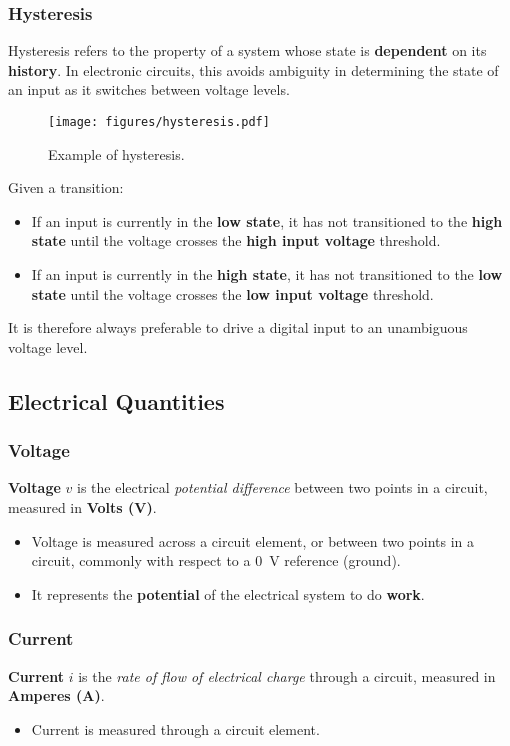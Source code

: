 \documentclass{article}
\begin{document}
\subsubsection{Hysteresis}
Hysteresis refers to the property of a system whose state is
\textbf{dependent} on its \textbf{history}. In electronic circuits,
this avoids ambiguity in determining the state of an input as it
switches between voltage levels.
\begin{figure}[H]
    \centering
    \texttt{[image: figures/hysteresis.pdf]}
    \caption{Example of hysteresis.} %
\end{figure}
Given a transition:
\begin{itemize}
    \item If an input is currently in the \textbf{low state}, it has
          not transitioned to the \textbf{high state} until the voltage
          crosses the \textbf{high input voltage} threshold.
    \item If an input is currently in the \textbf{high state}, it has
          not transitioned to the \textbf{low state} until the voltage
          crosses the \textbf{low input voltage} threshold.
\end{itemize}
It is therefore always preferable to drive a digital input to an unambiguous voltage level.
\subsection{Electrical Quantities}
\subsubsection{Voltage}
\textbf{Voltage} \(v\) is the electrical \textit{potential difference} between two points in a circuit, measured in \textbf{Volts (\unit{V})}.
\begin{itemize}
    \item Voltage is measured across a circuit element, or between two
          points in a circuit, commonly with respect to a \qty{0}{V}
          reference (ground).
    \item It represents the \textbf{potential} of the electrical system
          to do \textbf{work}.
\end{itemize}
\subsubsection{Current}
\textbf{Current} \(i\) is the \textit{rate of flow of electrical charge} through a circuit, measured in \textbf{Amperes (\unit{A})}.
\begin{itemize}
    \item Current is measured through a circuit element.
\end{itemize}
\end{document}
